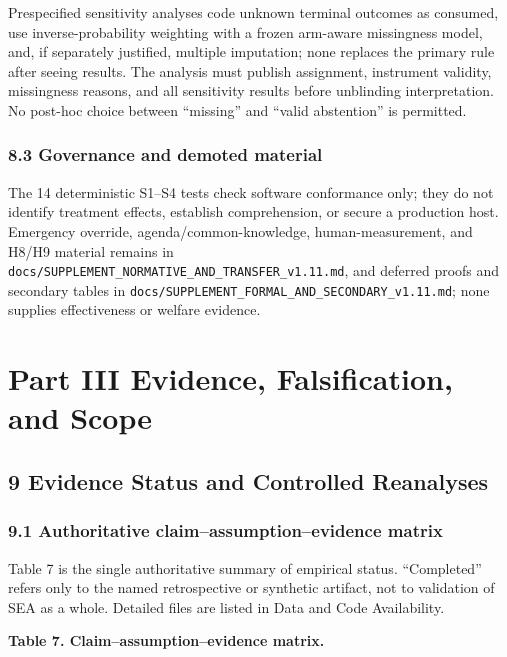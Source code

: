 \documentclass[
  11pt]{article}
\begin{document}
Prespecified sensitivity analyses code unknown terminal outcomes as
consumed, use inverse-probability weighting with a frozen arm-aware
missingness model, and, if separately justified, multiple imputation;
none replaces the primary rule after seeing results. The analysis must
publish assignment, instrument validity, missingness reasons, and all
sensitivity results before unblinding interpretation. No post-hoc choice
between ``missing'' and ``valid abstention'' is permitted.

\subsubsection{8.3 Governance and demoted
material}\label{governance-and-demoted-material}

The 14 deterministic S1--S4 tests check software conformance only; they
do not identify treatment effects, establish comprehension, or secure a
production host. Emergency override, agenda/common-knowledge,
human-measurement, and H8/H9 material remains in
\texttt{docs/SUPPLEMENT\_NORMATIVE\_AND\_TRANSFER\_v1.11.md}, and
deferred proofs and secondary tables in
\texttt{docs/SUPPLEMENT\_FORMAL\_AND\_SECONDARY\_v1.11.md}; none
supplies effectiveness or welfare evidence.

\section{Part III Evidence, Falsification, and
Scope}\label{part-iii-evidence-falsification-and-scope}

\subsection{9 Evidence Status and Controlled
Reanalyses}\label{evidence-status-and-controlled-reanalyses}

\subsubsection{9.1 Authoritative claim--assumption--evidence
matrix}\label{authoritative-claimassumptionevidence-matrix}

Table 7 is the single authoritative summary of empirical status.
``Completed'' refers only to the named retrospective or synthetic
artifact, not to validation of SEA as a whole. Detailed files are listed
in Data and Code Availability.

\textbf{Table 7. Claim--assumption--evidence matrix.}
\end{document}
